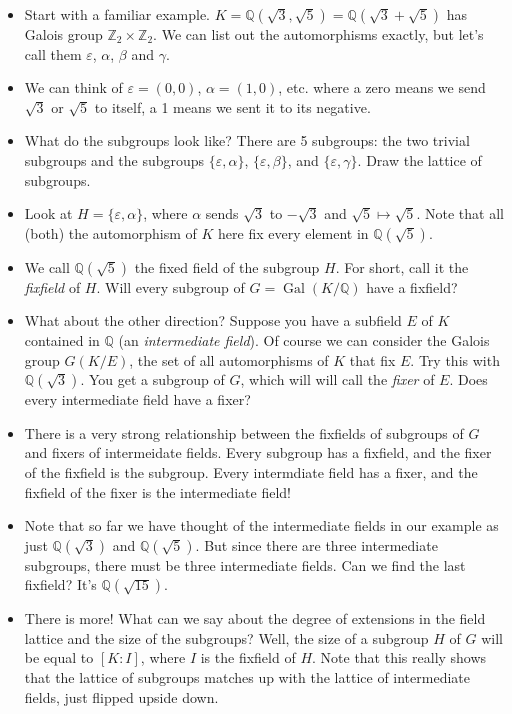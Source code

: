 \documentclass[12pt]{article}
\theoremstyle{plain}
\theoremstyle{definition}
\theoremstyle{remark}
\def\Z{\mathbb Z}
\def\Q{\mathbb Q}
\DeclareMathOperator{\Gal}{Gal}
\begin{document}
\begin{itemize}
  \item Start with a familiar example.  $K = \Q(\sqrt{3}, \sqrt{5}) = \Q(\sqrt{3}+\sqrt{5})$ has Galois group $\Z_2\times \Z_2$.  We can list out the automorphisms exactly, but let's call them $\varepsilon$, $\alpha$, $\beta$ and $\gamma$.  
  \item We can think of $\varepsilon = (0,0)$, $\alpha = (1,0)$, etc. where a zero means we send $\sqrt{3}$ or $\sqrt{5}$ to itself, a 1 means we sent it to its negative.
  \item What do the subgroups look like?  There are 5 subgroups: the two trivial subgroups and the subgroups $\{\varepsilon, \alpha\}$, $\{\varepsilon, \beta\}$, and $\{\varepsilon, \gamma\}$.  Draw the lattice of subgroups.
  \item Look at $H = \{\varepsilon, \alpha\}$, where $\alpha$ sends $\sqrt{3}$ to $-\sqrt{3}$ and $\sqrt{5} \mapsto \sqrt{5}$.  Note that all (both) the automorphism of $K$ here fix every element in $\Q(\sqrt{5})$.  
  \item We call $\Q(\sqrt{5})$ the fixed field of the subgroup $H$.  For short, call it the \emph{fixfield} of $H$.  Will every subgroup of $G = \Gal(K/\Q)$ have a fixfield?
  \item What about the other direction?  Suppose you have a subfield $E$ of $K$ contained in $\Q$ (an \emph{intermediate field}).  Of course we can consider the Galois group $G(K/E)$, the set of all automorphisms of $K$ that fix $E$.  Try this with $\Q(\sqrt{3})$.  You get a subgroup of $G$, which will will call the \emph{fixer} of $E$.  Does every intermediate field have a fixer?
  \item There is a very strong relationship between the fixfields of subgroups of $G$ and fixers of intermeidate fields.  Every subgroup has a fixfield, and the fixer of the fixfield is the subgroup.  Every intermdiate field has a fixer, and the fixfield of the fixer is the intermediate field!
  \item Note that so far we have thought of the intermediate fields in our example as just $\Q(\sqrt{3})$ and $\Q(\sqrt{5})$.  But since there are three intermediate subgroups, there must be three intermediate fields.  Can we find the last fixfield?  It's $\Q(\sqrt{15})$.
  \item There is more!  What can we say about the degree of extensions in the field lattice and the size of the subgroups?  Well, the size of a subgroup $H$ of $G$ will be equal to $[K:I]$, where $I$ is the fixfield of $H$.  Note that this really shows that the lattice of subgroups matches up with the lattice of intermediate fields, just flipped upside down.
\end{itemize}
\end{document}
